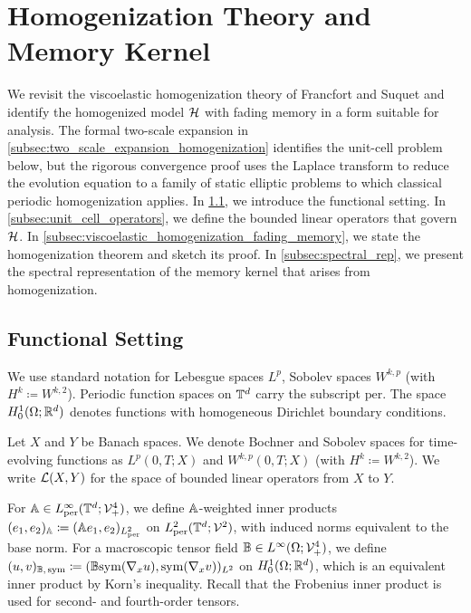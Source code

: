 \documentclass[3p, 12pt, preprint]{elsarticle}
\begin{document}
\section{Homogenization Theory and Memory Kernel}\label{sec:homogenization_theory}

We revisit the viscoelastic homogenization theory of Francfort and Suquet \cite{francfort1986homogenization} and identify the homogenized model ${\mathcal{H}}$ with fading memory in a form suitable for analysis. The formal two-scale expansion in \cref{subsec:two_scale_expansion_homogenization} identifies the unit-cell problem below, but the rigorous convergence proof uses the Laplace transform to reduce the evolution equation to a family of static elliptic problems to which classical periodic homogenization applies. In \cref{subsec:homogenization_theory_settings}, we introduce the functional setting. In \cref{subsec:unit_cell_operators}, we define the bounded linear operators that govern ${\mathcal{H}}$. In \cref{subsec:viscoelastic_homogenization_fading_memory}, we state the homogenization theorem and sketch its proof. In \cref{subsec:spectral_rep}, we present the spectral representation of the memory kernel that arises from homogenization.

\subsection{Functional Setting}\label{subsec:homogenization_theory_settings}

We use standard notation for Lebesgue spaces $L^p$, Sobolev spaces $W^{k,p}$ (with $H^k\coloneqq W^{k,2}$). Periodic function spaces on $\mathbb{T}^d$ carry the subscript $\mathrm{per}$. The space $H_0^1(\Omega;\mathbb{R}^d)$ denotes functions with homogeneous Dirichlet boundary conditions.

Let $X$ and $Y$ be Banach spaces. We denote Bochner and Sobolev spaces for time-evolving functions as $L^p(0,T;X)$ and $W^{k,p}(0,T;X)$ (with $H^k\coloneqq W^{k,2}$). We write ${\mathcal{L}}(X,Y)$ for the space of bounded linear operators from $X$ to $Y$.

For $\mathbb{A}\in L^{\infty}_{\mathrm{per}}(\mathbb{T}^d;{\mathcal{V}}^4_{+})$, we define $\mathbb{A}$-weighted inner products $(e_1, e_2)_{\mathbb{A}} \coloneqq (\mathbb{A} e_1, e_2)_{L^2_{\rm per}}$ on $L^{2}_{\mathrm{per}}(\mathbb{T}^d;{\mathcal{V}}^2)$, with induced norms equivalent to the base norm. For a macroscopic tensor field $\mathbb{B}\in L^{\infty}(\Omega;{\mathcal{V}}_{+}^4)$, we define $(u, v)_{\mathbb{B},\, \mathrm{sym}} \coloneqq (\mathbb{B}\mathrm{sym}(\nabla_x u), \mathrm{sym}(\nabla_x v))_{L^2}$ on $H_0^1(\Omega;\mathbb{R}^d)$, which is an equivalent inner product by Korn's inequality. Recall that the Frobenius inner product is used for second- and fourth-order tensors.
\end{document}
